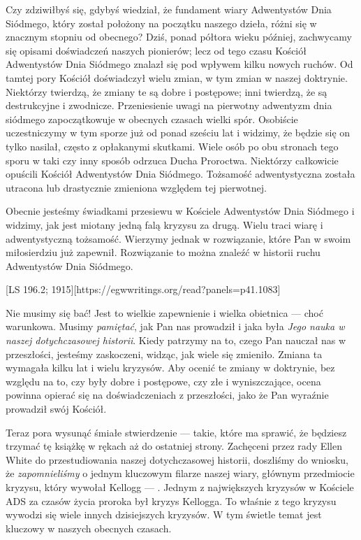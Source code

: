 Czy zdziwiłbyś się, gdybyś wiedział, że fundament wiary Adwentystów Dnia Siódmego, który został położony na początku naszego dzieła, różni się w znacznym stopniu od obecnego? Dziś, ponad półtora wieku później, zachwycamy się opisami doświadczeń naszych pionierów; lecz od tego czasu Kościół Adwentystów Dnia Siódmego znalazł się pod wpływem kilku nowych ruchów. Od tamtej pory Kościół doświadczył wielu zmian, w tym zmian w naszej doktrynie. Niektórzy twierdzą, że zmiany te są dobre i postępowe; inni twierdzą, że są destrukcyjne i zwodnicze. Przeniesienie uwagi na pierwotny adwentyzm dnia siódmego zapoczątkowuje w obecnych czasach wielki spór. Osobiście uczestniczymy w tym sporze już od ponad sześciu lat i widzimy, że będzie się on tylko nasilał, często z opłakanymi skutkami. Wiele osób po obu stronach tego sporu w taki czy inny sposób odrzuca Ducha Proroctwa. Niektórzy całkowicie opuścili Kościół Adwentystów Dnia Siódmego. Tożsamość adwentystyczna została utracona lub drastycznie zmieniona względem tej pierwotnej.

Obecnie jesteśmy świadkami przesiewu w Kościele Adwentystów Dnia Siódmego i widzimy, jak jest miotany jedną falą kryzysu za drugą. Wielu traci wiarę i adwentystyczną tożsamość. Wierzymy jednak w rozwiązanie, które Pan w swoim miłosierdziu już zapewnił. Rozwiązanie to można znaleźć w historii ruchu Adwentystów Dnia Siódmego.

[LS 196.2; 1915][https://egwwritings.org/read?panels=p41.1083]

Nie musimy się bać! Jest to wielkie zapewnienie i wielka obietnica — choć warunkowa. Musimy \textit{pamiętać}, jak Pan nas prowadził i jaka była \textit{Jego nauka w naszej dotychczasowej historii}. Kiedy patrzymy na to, czego Pan nauczał nas w przeszłości, jesteśmy zaskoczeni, widząc, jak wiele się zmieniło. Zmiana ta wymagała kilku lat i wielu kryzysów. Aby ocenić te zmiany w doktrynie, bez względu na to, czy były dobre i postępowe, czy złe i wyniszczające, ocena powinna opierać się na doświadczeniach z przeszłości, jako że Pan wyraźnie prowadził swój Kościół.

Teraz pora wysunąć śmiałe stwierdzenie — takie, które ma sprawić, że będziesz trzymać tę książkę w rękach aż do ostatniej strony. Zachęceni przez rady Ellen White do przestudiowania naszej dotychczasowej historii, doszliśmy do wniosku, że \textit{zapomnieliśmy} o jednym kluczowym filarze naszej wiary, głównym przedmiocie kryzysu, który wywołał Kellogg — . Jednym z największych kryzysów w Kościele ADS za czasów życia proroka był kryzys Kellogga. To właśnie z tego kryzysu wywodzi się wiele innych dzisiejszych kryzysów. W tym świetle temat  jest kluczowy w naszych obecnych czasach.

